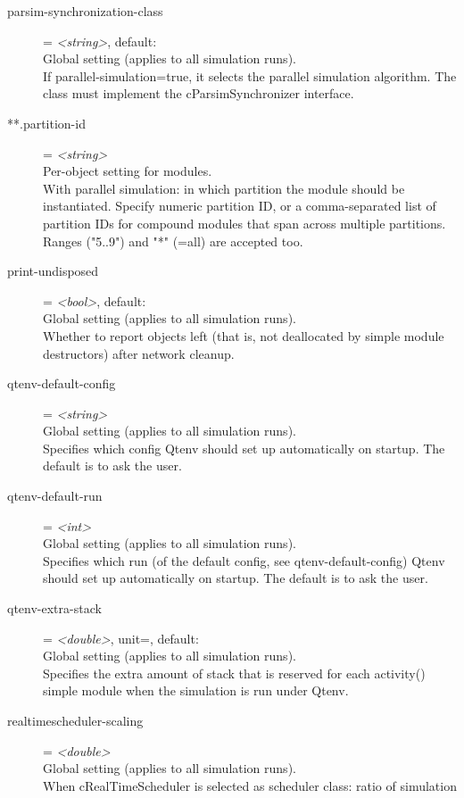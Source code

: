 \begin{description}
\item[parsim-synchronization-class] = \textit{<string>}, default: \\
    Global setting (applies to all simulation runs).\\
    If parallel-simulation=true, it selects the parallel simulation algorithm.
    The class must implement the cParsimSynchronizer interface.
\item[**.partition-id] = \textit{<string>}\\
    Per-object setting for modules.\\
    With parallel simulation: in which partition the module should be
    instantiated. Specify numeric partition ID, or a comma-separated list of
    partition IDs for compound modules that span across multiple partitions.
    Ranges ("5..9") and "*" (=all) are accepted too.
\item[print-undisposed] = \textit{<bool>}, default: \\
    Global setting (applies to all simulation runs).\\
    Whether to report objects left (that is, not deallocated by simple module
    destructors) after network cleanup.
\item[qtenv-default-config] = \textit{<string>}\\
    Global setting (applies to all simulation runs).\\
    Specifies which config Qtenv should set up automatically on startup. The
    default is to ask the user.
\item[qtenv-default-run] = \textit{<int>}\\
    Global setting (applies to all simulation runs).\\
    Specifies which run (of the default config, see qtenv-default-config) Qtenv
    should set up automatically on startup. The default is to ask the user.
\item[qtenv-extra-stack] = \textit{<double>}, unit=, default: \\
    Global setting (applies to all simulation runs).\\
    Specifies the extra amount of stack that is reserved for each activity()
    simple module when the simulation is run under Qtenv.
\item[realtimescheduler-scaling] = \textit{<double>}\\
    Global setting (applies to all simulation runs).\\
    When cRealTimeScheduler is selected as scheduler class: ratio of simulation

\end{description}
